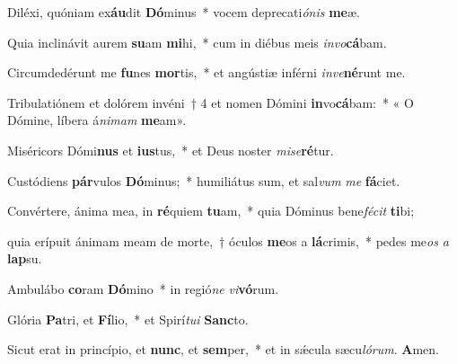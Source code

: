 \item Diléxi, quóniam ex\textbf{áu}dit \textbf{Dó}minus~* vocem deprecati\textit{ónis} \textbf{me}æ.

\item Quia inclinávit aurem \textbf{su}am \textbf{mi}hi,~* cum in diébus meis \textit{invo}\textbf{cá}bam.

\item Circumdedérunt me \textbf{fu}nes \textbf{mor}tis,~* et angústiæ inférni \textit{inve}\textbf{né}runt me.

\item Tribulatiónem et dolórem invéni~† 4 et nomen Dómini \textbf{in}vo\textbf{cá}bam:~* « O Dómine, líbera á\textit{nimam} \textbf{me}am».

\item Miséricors Dómi\textbf{nus} et \textbf{ius}tus,~* et Deus noster \textit{mise}\textbf{ré}tur.

\item Custódiens \textbf{pár}vulos \textbf{Dó}minus;~* humiliátus sum, et sal\textit{vum} \textit{me} \textbf{fá}ciet.

\item Convértere, ánima mea, in \textbf{ré}quiem \textbf{tu}am,~* quia Dóminus bene\textit{fécit} \textbf{ti}bi;

\item quia erípuit ánimam meam de morte,~† óculos \textbf{me}os a \textbf{lá}crimis,~* pedes me\textit{os} \textit{a} \textbf{lap}su.

\item Ambulábo \textbf{co}ram \textbf{Dó}mino~* in regió\textit{ne} \textit{vi}\textbf{vó}rum.

\item Glória \textbf{Pa}tri, et \textbf{Fí}lio,~* et Spirí\textit{tui} \textbf{Sanc}to.

\item Sicut erat in princípio, et \textbf{nunc}, et \textbf{sem}per,~* et in sǽcula sæcu\textit{lórum}. \textbf{A}men.